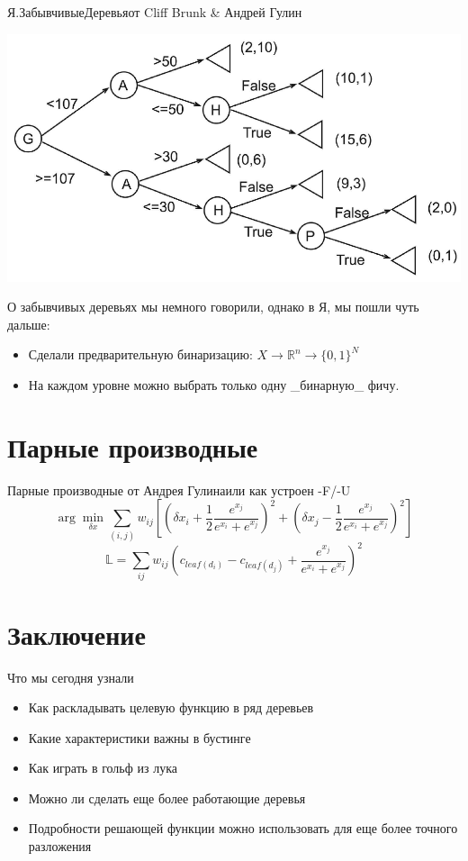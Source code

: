 \documentclass[14pt, fleqn, xcolor={dvipsnames, table}]{beamer}
\begin{document}
\begin{frame}{Я.ЗабывчивыеДеревья}{от Cliff Brunk \& Андрей Гулин}
\begin{center}
\includegraphics[height=0.3\textheight]{ObliviousTree.png} 
\end{center}
О забывчивых деревьях мы немного говорили, однако в Я, мы пошли чуть дальше:
\begin{itemize}
  \item Сделали предварительную бинаризацию: $X \to \mathbb{R}^n \to \{0, 1\}^N$
  \item На каждом уровне можно выбрать только одну \_бинарную\_ фичу.
\end{itemize} 
\end{frame}

\section{Парные производные}

\begin{frame}{Парные производные от Андрея Гулина}{или как устроен -F/-U}
$$
\arg \min_{\delta x} \sum_{(i,j)} w_{ij} \left[ \left( \delta x_i + \frac{1}{2} \frac{e^{x_j}}{e^{x_i} + e^{x_j}} \right)^2 + \left( \delta x_j - \frac{1}{2} \frac{e^{x_j}}{e^{x_i} + e^{x_j}} \right)^2 \right]
$$
$$
\mathbb{L} = \sum_{ij} w_{ij} \left(c_{leaf(d_i)} - c_{leaf(d_j)} + \frac{e^{x_j}}{e^{x_i}+e^{x_j}}\right)^2
$$

\end{frame}

\section{Заключение}

\begin{frame}{Что мы сегодня узнали}
\begin{itemize}
  \item Как раскладывать целевую функцию в ряд деревьев
  \item Какие характеристики важны в бустинге
  \item Как играть в гольф из лука
  \item Можно ли сделать еще более работающие деревья
  \item Подробности решающей функции можно использовать для еще более точного разложения
\end{itemize}
\end{frame}
\end{document}
